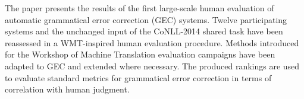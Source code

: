 The paper presents the results of the first large-scale human evaluation of automatic grammatical error correction (GEC) systems. Twelve participating systems and the unchanged input of the CoNLL-2014 shared task have been reassessed in a WMT-inspired human evaluation procedure. Methods introduced for the Workshop of Machine Translation evaluation campaigns have been adapted to GEC and extended where necessary. The produced rankings are used to evaluate standard metrics for grammatical error correction in terms of correlation with human judgment.
